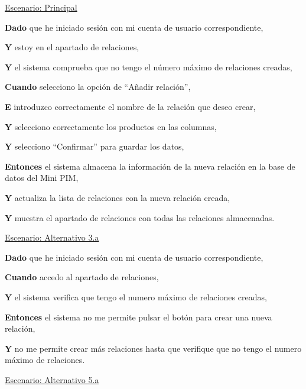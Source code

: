 \underline{Escenario: Principal}\par
\vspace{0.15cm}
\textbf{Dado} que he iniciado sesión con mi cuenta de usuario correspondiente,\par
\textbf{Y} estoy en el apartado de relaciones,\par
\textbf{Y} el sistema comprueba que no tengo el número máximo de relaciones creadas,\par
\textbf{Cuando} selecciono la opción de \enquote{Añadir relación},\par
\textbf{E} introduzco correctamente el nombre de la relación que deseo crear,\par
\textbf{Y} selecciono correctamente los productos en las columnas,\par
\textbf{Y} selecciono \enquote{Confirmar} para guardar los datos,\par
\textbf{Entonces} el sistema almacena la información de la nueva relación en la base de datos del Mini PIM,\par
\textbf{Y} actualiza la lista de relaciones con la nueva relación creada,\par
\textbf{Y} muestra el apartado de relaciones con todas las relaciones almacenadas.\par

\vspace{0.20cm}



\underline{Escenario: Alternativo 3.a}\par
\vspace{0.15cm}

\textbf{Dado} que he iniciado sesión con mi cuenta de usuario correspondiente,\par
\textbf{Cuando} accedo al apartado de relaciones,\par
\textbf{Y} el sistema verifica que tengo el numero máximo de relaciones creadas,\par
\textbf{Entonces} el sistema no me permite pulsar el botón para crear una nueva relación,\par
\textbf{Y} no me permite crear más relaciones hasta que verifique que no tengo el numero máximo de relaciones.\par
\vspace{0.20cm}

\underline{Escenario: Alternativo 5.a}\par
\vspace{0.15cm}

